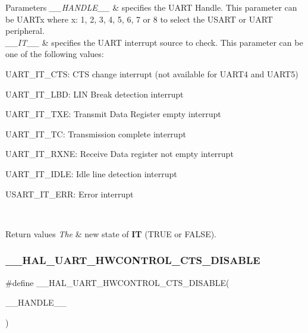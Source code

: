 \begin{DoxyParams}{Parameters}
{\em \+\_\+\+\_\+\+H\+A\+N\+D\+L\+E\+\_\+\+\_\+} & specifies the U\+A\+RT Handle. This parameter can be U\+A\+R\+Tx where x\+: 1, 2, 3, 4, 5, 6, 7 or 8 to select the U\+S\+A\+RT or U\+A\+RT peripheral. \\
\hline
{\em \+\_\+\+\_\+\+I\+T\+\_\+\+\_\+} & specifies the U\+A\+RT interrupt source to check. This parameter can be one of the following values\+: \begin{DoxyItemize}
\item U\+A\+R\+T\+\_\+\+I\+T\+\_\+\+C\+TS\+: C\+TS change interrupt (not available for U\+A\+R\+T4 and U\+A\+R\+T5) \item U\+A\+R\+T\+\_\+\+I\+T\+\_\+\+L\+BD\+: L\+IN Break detection interrupt \item U\+A\+R\+T\+\_\+\+I\+T\+\_\+\+T\+XE\+: Transmit Data Register empty interrupt \item U\+A\+R\+T\+\_\+\+I\+T\+\_\+\+TC\+: Transmission complete interrupt \item U\+A\+R\+T\+\_\+\+I\+T\+\_\+\+R\+X\+NE\+: Receive Data register not empty interrupt \item U\+A\+R\+T\+\_\+\+I\+T\+\_\+\+I\+D\+LE\+: Idle line detection interrupt \item U\+S\+A\+R\+T\+\_\+\+I\+T\+\_\+\+E\+RR\+: Error interrupt \end{DoxyItemize}
\\
\hline
\end{DoxyParams}

\begin{DoxyRetVals}{Return values}
{\em The} & new state of {\bfseries IT} (T\+R\+UE or F\+A\+L\+SE). \\
\hline
\end{DoxyRetVals}
\mbox{\label{group___u_a_r_t___exported___macros_ga0a26cb3a576c2700f76a7c697c86a499}} 
\subsubsection{\texorpdfstring{\+\_\+\+\_\+\+H\+A\+L\+\_\+\+U\+A\+R\+T\+\_\+\+H\+W\+C\+O\+N\+T\+R\+O\+L\+\_\+\+C\+T\+S\+\_\+\+D\+I\+S\+A\+B\+LE}{\_\_HAL\_UART\_HWCONTROL\_CTS\_DISABLE}}
{\footnotesize\ttfamily \#define \+\_\+\+\_\+\+H\+A\+L\+\_\+\+U\+A\+R\+T\+\_\+\+H\+W\+C\+O\+N\+T\+R\+O\+L\+\_\+\+C\+T\+S\+\_\+\+D\+I\+S\+A\+B\+LE(\begin{DoxyParamCaption}\item[{}]{\+\_\+\+\_\+\+H\+A\+N\+D\+L\+E\+\_\+\+\_\+ }\end{DoxyParamCaption})}

